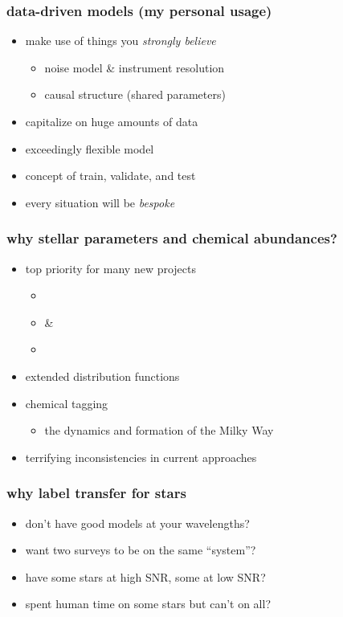 \documentclass[pdftex]{beamer}
\begin{document}
\begin{frame}
  \frametitle{data-driven models (my personal usage)}
  \begin{itemize}
  \item make use of things you \emph{strongly believe}
    \begin{itemize}
    \item noise model \& instrument resolution
    \item causal structure (shared parameters)
    \end{itemize}
  \item capitalize on huge amounts of data
  \item exceedingly flexible model
  \item concept of train, validate, and test
  \item every situation will be \emph{bespoke}
  \end{itemize}
\end{frame}

\begin{frame}
  \frametitle{why stellar parameters and chemical abundances?}
  \begin{itemize}
  \item top priority for many new projects
    \begin{itemize}
    \item \gaia
    \item {} \& 
    \item \sdssiii\ \apogee
    \end{itemize}
  \item extended distribution functions
  \item chemical tagging
    \begin{itemize}
    \item the dynamics and formation of the Milky Way
    \end{itemize}
  \item terrifying inconsistencies in current approaches
  \end{itemize}
\end{frame}

\begin{frame}
  \frametitle{why label transfer for stars}
  \begin{itemize}
  \item don't have good models at your wavelengths?
  \item want two surveys to be on the same ``system''?
  \item have some stars at high SNR, some at low SNR?
  \item spent human time on some stars but can't on all?
  \end{itemize}
\end{frame}
\end{document}
